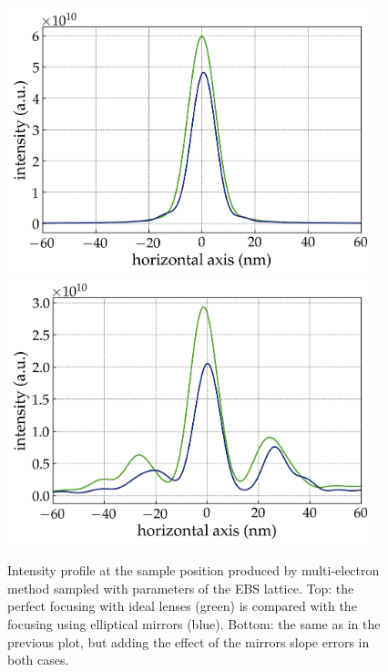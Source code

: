 \documentclass{iucr}              %
\begin{document}
\begin{figure}
    \centering
        \includegraphics[width=0.95\textwidth]{GRAPHICS/EBS_ideal.png}
        \includegraphics[width=0.95\textwidth]{GRAPHICS/EBS_real.png}
    \label{fig:FiniteEmittanceB}
    \caption{
    Intensity profile at the sample position produced by multi-electron method sampled with parameters of the EBS lattice. 
    Top: the perfect focusing with ideal lenses (green) is compared with the focusing using elliptical mirrors (blue). Bottom: the same as in the previous plot, but adding the effect of the mirrors slope errors in both cases.
    }
\end{figure}
\end{document}
